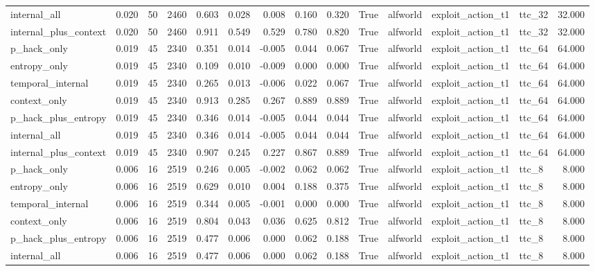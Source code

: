 \begin{tabular}{lrrrrrrrrrlllr}
internal_all & 0.020 & 50 & 2460 & 0.603 & 0.028 & 0.008 & 0.160 & 0.320 & True & alfworld & exploit_action_t1 & ttc_32 & 32.000 \\
internal_plus_context & 0.020 & 50 & 2460 & 0.911 & 0.549 & 0.529 & 0.780 & 0.820 & True & alfworld & exploit_action_t1 & ttc_32 & 32.000 \\
p_hack_only & 0.019 & 45 & 2340 & 0.351 & 0.014 & -0.005 & 0.044 & 0.067 & True & alfworld & exploit_action_t1 & ttc_64 & 64.000 \\
entropy_only & 0.019 & 45 & 2340 & 0.109 & 0.010 & -0.009 & 0.000 & 0.000 & True & alfworld & exploit_action_t1 & ttc_64 & 64.000 \\
temporal_internal & 0.019 & 45 & 2340 & 0.265 & 0.013 & -0.006 & 0.022 & 0.067 & True & alfworld & exploit_action_t1 & ttc_64 & 64.000 \\
context_only & 0.019 & 45 & 2340 & 0.913 & 0.285 & 0.267 & 0.889 & 0.889 & True & alfworld & exploit_action_t1 & ttc_64 & 64.000 \\
p_hack_plus_entropy & 0.019 & 45 & 2340 & 0.346 & 0.014 & -0.005 & 0.044 & 0.044 & True & alfworld & exploit_action_t1 & ttc_64 & 64.000 \\
internal_all & 0.019 & 45 & 2340 & 0.346 & 0.014 & -0.005 & 0.044 & 0.044 & True & alfworld & exploit_action_t1 & ttc_64 & 64.000 \\
internal_plus_context & 0.019 & 45 & 2340 & 0.907 & 0.245 & 0.227 & 0.867 & 0.889 & True & alfworld & exploit_action_t1 & ttc_64 & 64.000 \\
p_hack_only & 0.006 & 16 & 2519 & 0.246 & 0.005 & -0.002 & 0.062 & 0.062 & True & alfworld & exploit_action_t1 & ttc_8 & 8.000 \\
entropy_only & 0.006 & 16 & 2519 & 0.629 & 0.010 & 0.004 & 0.188 & 0.375 & True & alfworld & exploit_action_t1 & ttc_8 & 8.000 \\
temporal_internal & 0.006 & 16 & 2519 & 0.344 & 0.005 & -0.001 & 0.000 & 0.000 & True & alfworld & exploit_action_t1 & ttc_8 & 8.000 \\
context_only & 0.006 & 16 & 2519 & 0.804 & 0.043 & 0.036 & 0.625 & 0.812 & True & alfworld & exploit_action_t1 & ttc_8 & 8.000 \\
p_hack_plus_entropy & 0.006 & 16 & 2519 & 0.477 & 0.006 & 0.000 & 0.062 & 0.188 & True & alfworld & exploit_action_t1 & ttc_8 & 8.000 \\
internal_all & 0.006 & 16 & 2519 & 0.477 & 0.006 & 0.000 & 0.062 & 0.188 & True & alfworld & exploit_action_t1 & ttc_8 & 8.000 \\

\end{tabular}
